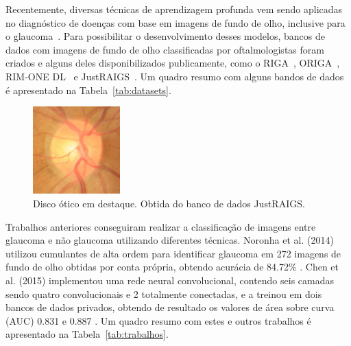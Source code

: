 \documentclass[12pt]{article}
\begin{document}

Recentemente, diversas técnicas de aprendizagem profunda vem sendo aplicadas no diagnóstico de doenças com base em imagens de fundo de olho, inclusive para o glaucoma~\cite{li_review_2021}. Para possibilitar o desenvolvimento desses modelos, bancos de dados com imagens de fundo de olho classificadas por oftalmologistas foram criados e alguns deles disponibilizados publicamente, como o RIGA~\cite{riga}, ORIGA~\cite{origa}, RIM-ONE DL~\cite{RIMONEDL} e JustRAIGS~\cite{justraigs}. Um quadro resumo com alguns bandos de dados é apresentado na Tabela~\ref{tab:datasets}. 

\begin{figure}[htb]
 \centering
 \includegraphics[width=0.3\textwidth]{images/disk.jpg}
 \caption{Disco ótico em destaque. Obtida do banco de dados JustRAIGS.}
 \label{fig:disk}
\end{figure}


Trabalhos anteriores conseguiram realizar a classificação de imagens entre glaucoma e não glaucoma utilizando diferentes técnicas. Noronha et al. (2014) utilizou cumulantes de alta ordem para identificar glaucoma em 272 imagens de fundo de olho obtidas por conta própria, obtendo acurácia de 84.72\% \cite{Noronha2014}. Chen et al. (2015) implementou uma rede neural convolucional, contendo seis camadas sendo quatro convolucionais e 2 totalmente conectadas, e a treinou em dois bancos de dados privados, obtendo de resultado os valores de área sobre curva (AUC) 0.831 e 0.887 \cite{chen2015glaucomadetection}. Um quadro resumo com estes e outros trabalhos é apresentado na Tabela~\ref{tab:trabalhos}.
\end{document}
